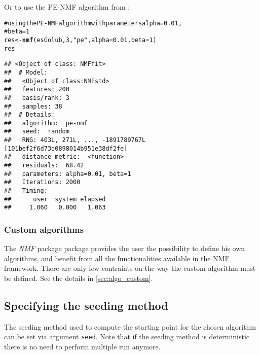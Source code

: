 \documentclass[a4paper]{article}\usepackage{graphicx, color}
\makeatletter
\newcommand{\hlfunctioncall}[1]{\textcolor[rgb]{0.501960784313725,0,0.329411764705882}{\textbf{#1}}}%
\newcommand{\hlstring}[1]{\textcolor[rgb]{0.6,0.6,1}{#1}}%
\newcommand{\hlcomment}[1]{\textcolor[rgb]{0.180392156862745,0.6,0.341176470588235}{#1}}%
\newenvironment{kframe}{%
 \def\at@end@of@kframe{}%
 \ifinner\ifhmode%
  \def\at@end@of@kframe{\end{minipage}}%
  \begin{minipage}{\columnwidth}%
 \fi\fi%
 \def\FrameCommand##1{\hskip\@totalleftmargin \hskip-\fboxsep
 \colorbox{shadecolor}{##1}\hskip-\fboxsep
     \hskip-\linewidth \hskip-\@totalleftmargin \hskip\columnwidth}%
 \MakeFramed {\advance\hsize-\width
   \@totalleftmargin\z@ \linewidth\hsize
   \@setminipage}}%
 {\par\unskip\endMakeFramed%
 \at@end@of@kframe}
\newenvironment{knitrout}{}{} %
\let\code=\texttt
\newcommand{\pkgname}[1]{\textit{#1}\xspace}
\newcommand{\Rpkg}[1]{\pkgname{#1} package\xspace}
\newcommand{\nmfpack}{\Rpkg{NMF}}
\renewcommand{\cite}[1]{\parencite{#1}}
\makeatother
\begin{document}
Or to use the PE-NMF algorithm from \cite{Zhang2008}:
\begin{knitrout}
\color{fgcolor}\begin{kframe}
\begin{alltt}
\hlcomment{# using the PE-NMF algorithm with parameters alpha=0.01,}
\hlcomment{# beta=1}
res <- \hlfunctioncall{nmf}(esGolub, 3, \hlstring{"pe"}, alpha = 0.01, beta = 1)
res
\end{alltt}
\begin{verbatim}
## <Object of class: NMFfit>
##  # Model:
##   <Object of class:NMFstd>
##   features: 200 
##   basis/rank: 3 
##   samples: 38 
##  # Details:
##   algorithm:  pe-nmf 
##   seed:  random 
##   RNG: 403L, 271L, ..., -1891789767L [101bef2f6d73d0898014b951e38df2fe]
##   distance metric:  <function> 
##   residuals:  68.42 
##   parameters: alpha=0.01, beta=1 
##   Iterations: 2000 
##   Timing:
##      user  system elapsed 
##     1.060   0.000   1.063
\end{verbatim}
\end{kframe}
\end{knitrout}


%
%
%


\subsubsection{Custom algorithms}
The \nmfpack package provides the user the possibility to define his own algorithms, and benefit from all the functionalities available in the NMF framework.
There are only few contraints on the way the custom algorithm must be defined.
See the details in \cref{sec:algo_custom}.

\subsection{Specifying the seeding method}\label{sec:seed}
The seeding method used to compute the starting point for the chosen algorithm can be set via argument \code{seed}. 
Note that if the seeding method is deterministic there is no need to perform multiple run anymore.
\end{document}
